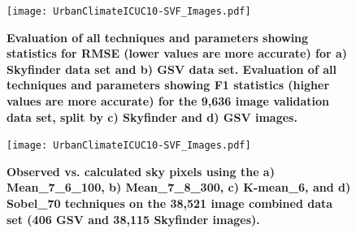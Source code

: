 \documentclass[final,3p,times,authoryear]{elsarticle}
\begin{document}
\begin{figure}
\centering
\texttt{[image: UrbanClimateICUC10-SVF\_Images.pdf]} 
\caption{\textbf{
Evaluation of all techniques and parameters showing statistics for RMSE (lower values are more accurate) for a) Skyfinder data set and b) GSV data set. Evaluation of all techniques and parameters showing F1 statistics (higher values are more accurate) for the 9,636 image validation data set, split by c) Skyfinder and d) GSV images.}}
\label{fig:stats}
\end{figure}



\begin{figure}
\centering
\texttt{[image: UrbanClimateICUC10-SVF\_Images.pdf]} 
\caption{\textbf{Observed vs. calculated sky pixels using the a) Mean\_7\_6\_100, b) Mean\_7\_8\_300, c) K-mean\_6, and d) Sobel\_70 techniques on the 38,521 image combined data set (406 GSV and 38,115 Skyfinder images).} }
\label{fig:errorallcombined}
\end{figure}
\end{document}
